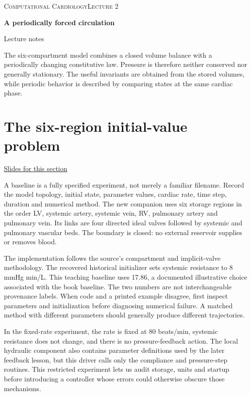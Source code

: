 \documentclass[11pt,letterpaper]{article}
\theoremstyle{definition}\newtheorem{definition}{Definition}\newtheorem{example}{Example}
\numberwithin{equation}{section}
\begin{document}
{\small\scshape Computational Cardiology\hfill Lecture 2}\par\medskip
{\raggedright{}\LARGE\bfseries\color{ink} A periodically forced circulation\par}\medskip
{\small Lecture notes}\par\bigskip
The six-compartment model combines a closed volume balance with a periodically changing constitutive law. Pressure is therefore neither conserved nor generally stationary. The useful invariants are obtained from the stored volumes, while periodic behavior is described by comparing states at the same cardiac phase.

\section{The six-region initial-value problem}
\hypertarget{note-the-six-region-initial-value-problem}{}\label{note:the-six-region-initial-value-problem}
{\small \href{slides.html\#frame=a-closed-six-region-network\&step=1}{Slides for this section}}\par
A baseline is a fully specified experiment, not merely a familiar filename. Record the model topology, initial state, parameter values, cardiac rate, time step, duration and numerical method. The new companion uses six storage regions in the order LV, systemic artery, systemic vein, RV, pulmonary artery and pulmonary vein. Its links are four directed ideal valves followed by systemic and pulmonary vascular beds. The boundary is closed: no external reservoir supplies or removes blood.

The implementation follows the source's compartment and implicit-valve methodology. The recovered historical initializer sets systemic resistance to 8 mmHg min/L. This teaching baseline uses 17.86, a documented illustrative choice associated with the book baseline. The two numbers are not interchangeable provenance labels. When code and a printed example disagree, first inspect parameters and initialization before diagnosing numerical failure. A matched method with different parameters should generally produce different trajectories.

In the fixed-rate experiment, the rate is fixed at 80 beats/min, systemic resistance does not change, and there is no pressure-feedback action. The local hydraulic component also contains parameter definitions used by the later feedback lesson, but this driver calls only the compliance and pressure-step routines. This restricted experiment lets us audit storage, units and startup before introducing a controller whose errors could otherwise obscure those mechanisms.
\end{document}
